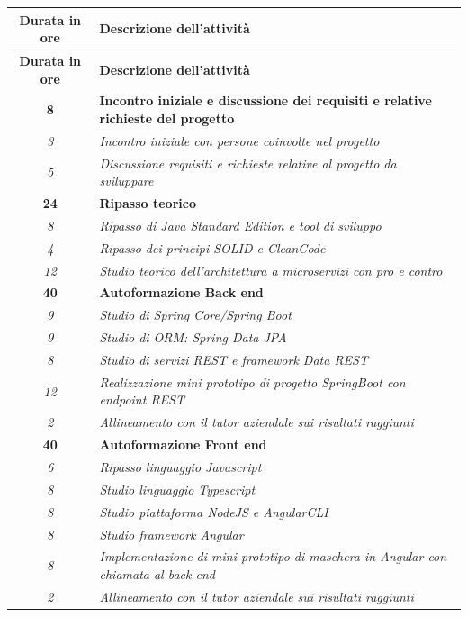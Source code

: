 

\begin{longtable}{|c|p{}|}
	\hline
    \textbf{Durata in ore} & \textbf{Descrizione dell'attività} \\ 
    \hline
    \endfirsthead

    \hline
    \textbf{Durata in ore} & \textbf{Descrizione dell'attività} \\ 
    \hline
    \endhead

    \textbf{8} & \textbf{Incontro iniziale e discussione dei requisiti e relative richieste del progetto} \\ \hdashline
    \textit{3} & 
    \textit{Incontro iniziale con persone coinvolte nel progetto} \\
    \textit{5} & 
    \textit{Discussione requisiti e richieste relative al progetto da sviluppare} \\
    \hline

	\textbf{24} & \textbf{Ripasso teorico} \\ \hdashline
    \textit{8} & 
    \textit{Ripasso di Java Standard Edition e tool di sviluppo} \\
    \textit{4} & 
    \textit{Ripasso dei principi SOLID e CleanCode} \\
    \textit{12} & 
    \textit{Studio teorico dell'architettura a microservizi con pro e contro} \\
    \hline
    
    \textbf{40} & \textbf{Autoformazione Back end} \\ \hdashline
    \textit{9} & 
    \textit{Studio di Spring Core/Spring Boot} \\
    \textit{9} & 
    \textit{Studio di ORM: Spring Data JPA} \\
    \textit{8} & 
    \textit{Studio di servizi REST e framework Data REST} \\
    \textit{12} & 
    \textit{Realizzazione mini prototipo di progetto SpringBoot con endpoint REST} \\
    \textit{2} & 
    \textit{Allineamento con il tutor aziendale sui risultati raggiunti} \\
    \hline
    
    \textbf{40} & \textbf{Autoformazione Front end} \\ \hdashline
    \textit{6} & 
    \textit{Ripasso linguaggio Javascript} \\
    \textit{8} & 
    \textit{Studio linguaggio Typescript} \\
    \textit{8} & 
    \textit{Studio piattaforma NodeJS e AngularCLI} \\
    \textit{8} & 
    \textit{Studio framework Angular} \\
    \textit{8} & 
    \textit{Implementazione di mini prototipo di maschera in Angular con chiamata al back-end} \\
    \textit{2} & 
    \textit{Allineamento con il tutor aziendale sui risultati raggiunti} \\
    \hline


\end{longtable}
